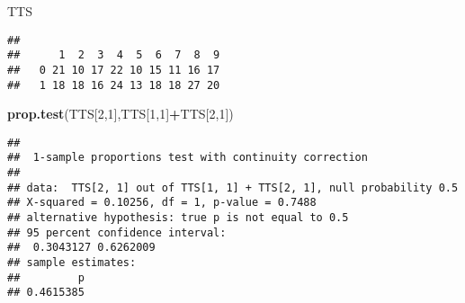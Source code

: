 \documentclass[]{article}
\newenvironment{Shaded}{\begin{snugshade}}{\end{snugshade}}
\newcommand{\DecValTok}[1]{\textcolor[rgb]{0.00,0.00,0.81}{#1}}
\newcommand{\KeywordTok}[1]{\textcolor[rgb]{0.13,0.29,0.53}{\textbf{#1}}}
\newcommand{\NormalTok}[1]{#1}
\newcommand{\OperatorTok}[1]{\textcolor[rgb]{0.81,0.36,0.00}{\textbf{#1}}}
\begin{document}
\begin{Shaded}
\begin{Highlighting}[]
\NormalTok{TTS}
\end{Highlighting}
\end{Shaded}

\begin{verbatim}
##    
##      1  2  3  4  5  6  7  8  9
##   0 21 10 17 22 10 15 11 16 17
##   1 18 18 16 24 13 18 18 27 20
\end{verbatim}

\begin{Shaded}
\begin{Highlighting}[]
\KeywordTok{prop.test}\NormalTok{(TTS[}\DecValTok{2}\NormalTok{,}\DecValTok{1}\NormalTok{],TTS[}\DecValTok{1}\NormalTok{,}\DecValTok{1}\NormalTok{]}\OperatorTok{+}\NormalTok{TTS[}\DecValTok{2}\NormalTok{,}\DecValTok{1}\NormalTok{])}
\end{Highlighting}
\end{Shaded}

\begin{verbatim}
## 
##  1-sample proportions test with continuity correction
## 
## data:  TTS[2, 1] out of TTS[1, 1] + TTS[2, 1], null probability 0.5
## X-squared = 0.10256, df = 1, p-value = 0.7488
## alternative hypothesis: true p is not equal to 0.5
## 95 percent confidence interval:
##  0.3043127 0.6262009
## sample estimates:
##         p 
## 0.4615385
\end{verbatim}
\end{document}
